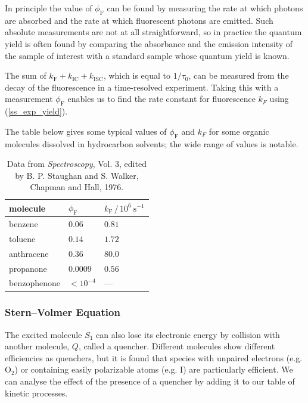\documentclass{article}
\theoremstyle{plain}\theoremheaderfont{\normalfont\itshape}\theorembodyfont{\rmfamily}\theoremseparator{.}\newtheorem*{rem}{Remark}\newtheorem*{ex}{Example}\newtheorem*{proof}{Proof}\newtheorem*{altp}{Alternative proof}
\theoremstyle{plain}\theoremheaderfont{\normalfont\bfseries}\theorembodyfont{\rmfamily}\theoremseparator{.}\newtheorem{thm}{Theorem}[section]\newtheorem{lem}[thm]{Lemma}\newtheorem{prop}[thm]{Proposition}\newtheorem*{cor}{Corollary}\newtheorem{defn}[thm]{Definition}\newtheorem{clm}[thm]{Claim}\newtheorem{clminproof}{Claim}\newtheorem{pos}{Postulate}[section]
\theoremstyle{break}\theoremheaderfont{\normalfont\itshape}\theorembodyfont{\rmfamily}\theoremseparator{.\medskip}\newtheorem*{proofskip}{Proof}\newtheorem*{exs}{Examples}\newtheorem*{rems}{Remarks}
\theoremstyle{break}\theoremheaderfont{\normalfont\bfseries}\theorembodyfont{\rmfamily}\theoremseparator{.\medskip}\newtheorem{lemskip}[thm]{Lemma}\newtheorem{defnskip}[thm]{Definition}\newtheorem{propskip}[thm]{Proposition}\newtheorem{thmskip}[thm]{Theorem}
\numberwithin{equation}{section}
\newcommand{\unit}[1]{\ \mathrm{#1}}
\newcommand{\FF}{_{\text{F}}}
\newcommand{\IC}{_{\text{IC}}}
\newcommand{\ISC}{_{\text{ISC}}}
\begin{document}
    In principle the value of \(\phi\FF\) can be found by measuring the rate at which photons are absorbed and the rate at which fluorescent photons are emitted. Such absolute measurements are not at all straightforward, so in practice the quantum yield is often found by comparing the absorbance and the emission intensity of the sample of interest with a standard sample whose quantum yield is known.

    The sum of \(k\FF+k\IC+k\ISC\), which is equal to \(1/\tau_0\), can be measured from the decay of the fluorescence in a time-resolved experiment. Taking this with a measurement \(\phi\FF\) enables us to find the rate constant for fluorescence \(k_F\) using (\ref{ss_exp_yield}).

    The table below gives some typical values of \(\phi\FF\) and \(k_F\) for some organic molecules dissolved in hydrocarbon solvents; the wide range of values is notable.

    \begin{table}[ht!]
        \centering
        \begin{tabular}{lll}
            \toprule
            molecule & \(\phi\FF\) & \(k\FF\,/\, 10^{6}\unit{s}^{-1}\) \\ \midrule
            benzene & \(0.06\) & \(0.81\) \\
            toluene & \(0.14\) & \(1.72\) \\
            anthracene & \(0.36\) & \(80.0\) \\
            propanone & \(0.0009\) & \(0.56\) \\
            benzophenone & \(<10^{-4}\) & --- \\ \bottomrule
        \end{tabular}
        \caption{Data from \textit{Spectroscopy}, Vol. 3, edited by B. P. Staughan and S. Walker, Chapman and Hall, 1976.}
    \end{table}

    \subsubsection{Stern--Volmer Equation}
    The excited molecule \(S_1\) can also lose its electronic energy by collision with another molecule, \(Q\), called a quencher. Different molecules show different efficiencies as quenchers, but it is found that species with unpaired electrons (e.g. \(\mathrm{O_2}\)) or containing easily polarizable atoms (e.g. \(\mathrm{I}\)) are particularly efficient. We can analyse the effect of the presence of a quencher by adding it to our table of kinetic processes.
\end{document}
